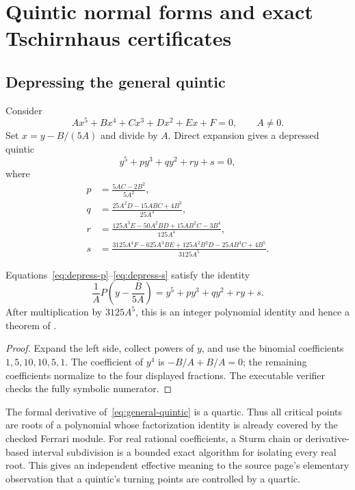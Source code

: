 \section{Quintic normal forms and exact Tschirnhaus certificates}\label{sec:normal-forms}

\subsection{Depressing the general quintic}

Consider
\begin{equation}\label{eq:general-quintic}
 A x^5+B x^4+C x^3+D x^2+E x+F=0,
 \qquad A\ne0.
\end{equation}
Set \(x=y-B/(5A)\) and divide by \(A\).  Direct expansion gives a depressed
quintic
\begin{equation}\label{eq:depressed-quintic}
 y^5+p y^3+q y^2+r y+s=0,
\end{equation}
where
\begin{align}
 p&=\frac{5AC-2B^2}{5A^2},\label{eq:depress-p}\\
 q&=\frac{25A^2D-15ABC+4B^3}{25A^3},\label{eq:depress-q}\\
 r&=\frac{125A^3E-50A^2BD+15AB^2C-3B^4}{125A^4},\label{eq:depress-r}\\
 s&=\frac{3125A^4F-625A^3BE+125A^2B^2D-25AB^3C+4B^5}
          {3125A^5}.\label{eq:depress-s}
\end{align}

\begin{theorem}\label{thm:depress-quintic}
Equations~\eqref{eq:depress-p}--\eqref{eq:depress-s} satisfy the identity
\begin{equation}\label{eq:depress-identity}
 \frac1A P\!\left(y-\frac{B}{5A}\right)
 =y^5+py^3+qy^2+ry+s.
\end{equation}
After multiplication by \(3125A^5\), this is an integer polynomial identity
and hence a theorem of \ipra.
\end{theorem}

\begin{proof}
Expand the left side, collect powers of \(y\), and use the binomial
coefficients \(1,5,10,10,5,1\).  The coefficient of \(y^4\) is
\(-B/A+B/A=0\); the remaining coefficients normalize to the four displayed
fractions.  The executable verifier checks the fully symbolic numerator.
\end{proof}

The formal derivative of~\eqref{eq:general-quintic} is a quartic.  Thus all
critical points are roots of a polynomial whose factorization identity is
already covered by the checked Ferrari module.  For real rational coefficients,
a Sturm chain or derivative-based interval subdivision is a bounded exact
algorithm for isolating every real root.  This gives an independent effective
meaning to the source page's elementary observation that a quintic's turning
points are controlled by a quartic.

